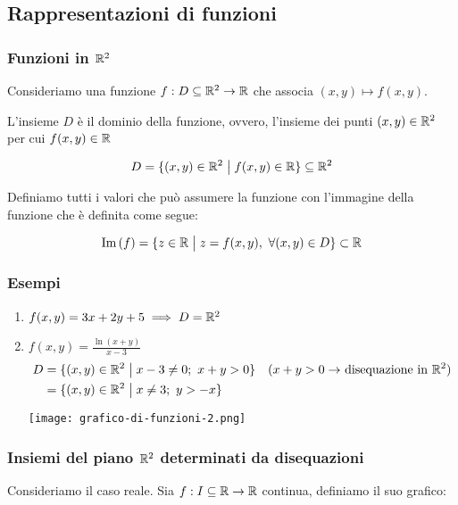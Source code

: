 \subsection{Rappresentazioni di funzioni}

\subsubsection{Funzioni in \texorpdfstring{\(\mathbb{R}^2\)}{R2}}

Consideriamo una funzione \(f: D \subseteq \mathbb{R}^2 \to \mathbb{R} \) che associa \((x,y) \mapsto f(x,y)\).

L'insieme \(D\) è il dominio della funzione, ovvero, l'insieme dei punti \((x,y) \in \mathbb{R}^2\) per cui \(f(x,y) \in \mathbb{R} \)

\[D = \{(x,y) \in \mathbb{R}^2 \;\big|\; f(x,y) \in \mathbb{R} \} \subseteq \mathbb{R}^2 \]

Definiamo tutti i valori che può assumere la funzione con l'immagine della funzione che è definita come segue:

\[\text{Im}\left(f\right) = \{z \in \mathbb{R} \;\big|\; z = f(x,y), ~\forall (x,y) \in D\} \subset \mathbb{R} \]

\subsubsection*{Esempi}

\begin{enumerate}
    \item \(f(x,y) = 3x + 2y + 5 \implies D=\mathbb{R}^2\)
    \item \(f(x,y) = \frac{\ln(x+y)}{x-3}\)
          \begin{align*}
              D & = \{(x,y) \in \mathbb{R}^2 \;\big|\; x-3 \ne 0;\ x+y > 0\} & \text{(\(x+y > 0 \to \) disequazione in \(\mathbb{R}^2\))} \\
                & = \{(x,y) \in \mathbb{R}^2 \;\big|\; x \ne 3;\ y > -x\}
          \end{align*}

          \texttt{[image: grafico-di-funzioni-2.png]}
\end{enumerate}

\filbreak{}
\subsubsection{Insiemi del piano \texorpdfstring{\(\mathbb{R}^2\)}{R2} determinati da disequazioni}

Consideriamo il caso reale. Sia \(f: I \subseteq \mathbb{R} \to \mathbb{R} \) continua, definiamo il suo grafico:

